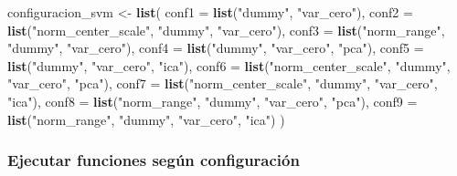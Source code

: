 \documentclass[
]{article}
\newenvironment{Shaded}{\begin{snugshade}}{\end{snugshade}}
\newcommand{\AttributeTok}[1]{\textcolor[rgb]{0.13,0.29,0.53}{#1}}
\newcommand{\FunctionTok}[1]{\textcolor[rgb]{0.13,0.29,0.53}{\textbf{#1}}}
\newcommand{\NormalTok}[1]{#1}
\newcommand{\OtherTok}[1]{\textcolor[rgb]{0.56,0.35,0.01}{#1}}
\newcommand{\StringTok}[1]{\textcolor[rgb]{0.31,0.60,0.02}{#1}}
\begin{document}
\begin{Shaded}
\begin{Highlighting}[]
\NormalTok{configuracion\_svm }\OtherTok{\textless{}{-}} \FunctionTok{list}\NormalTok{(}
  \AttributeTok{conf1  =} \FunctionTok{list}\NormalTok{(}\StringTok{"dummy"}\NormalTok{, }\StringTok{"var\_cero"}\NormalTok{),}
  \AttributeTok{conf2  =} \FunctionTok{list}\NormalTok{(}\StringTok{"norm\_center\_scale"}\NormalTok{, }\StringTok{"dummy"}\NormalTok{, }\StringTok{"var\_cero"}\NormalTok{),}
  \AttributeTok{conf3  =} \FunctionTok{list}\NormalTok{(}\StringTok{"norm\_range"}\NormalTok{, }\StringTok{"dummy"}\NormalTok{, }\StringTok{"var\_cero"}\NormalTok{),}
  \AttributeTok{conf4  =} \FunctionTok{list}\NormalTok{(}\StringTok{"dummy"}\NormalTok{, }\StringTok{"var\_cero"}\NormalTok{, }\StringTok{"pca"}\NormalTok{),}
  \AttributeTok{conf5  =} \FunctionTok{list}\NormalTok{(}\StringTok{"dummy"}\NormalTok{, }\StringTok{"var\_cero"}\NormalTok{, }\StringTok{"ica"}\NormalTok{),}
  \AttributeTok{conf6  =} \FunctionTok{list}\NormalTok{(}\StringTok{"norm\_center\_scale"}\NormalTok{, }\StringTok{"dummy"}\NormalTok{, }\StringTok{"var\_cero"}\NormalTok{, }\StringTok{"pca"}\NormalTok{),}
  \AttributeTok{conf7  =} \FunctionTok{list}\NormalTok{(}\StringTok{"norm\_center\_scale"}\NormalTok{, }\StringTok{"dummy"}\NormalTok{, }\StringTok{"var\_cero"}\NormalTok{, }\StringTok{"ica"}\NormalTok{),}
  \AttributeTok{conf8  =} \FunctionTok{list}\NormalTok{(}\StringTok{"norm\_range"}\NormalTok{, }\StringTok{"dummy"}\NormalTok{, }\StringTok{"var\_cero"}\NormalTok{, }\StringTok{"pca"}\NormalTok{),}
  \AttributeTok{conf9  =} \FunctionTok{list}\NormalTok{(}\StringTok{"norm\_range"}\NormalTok{, }\StringTok{"dummy"}\NormalTok{, }\StringTok{"var\_cero"}\NormalTok{, }\StringTok{"ica"}\NormalTok{)}
\NormalTok{)}
\end{Highlighting}
\end{Shaded}

\hypertarget{ejecutar-funciones-seguxfan-configuraciuxf3n-1}{%
\subsubsection{Ejecutar funciones según
configuración}\label{ejecutar-funciones-seguxfan-configuraciuxf3n-1}}
\end{document}

